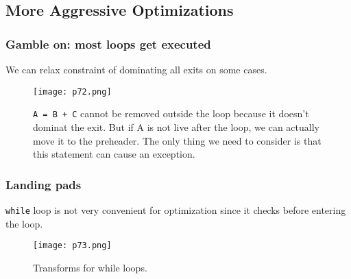 \subsection{More Aggressive Optimizations}

\subsubsection{Gamble on: most loops get executed}

We can relax constraint of dominating all exits on some cases.

\begin{figure}[H]
    \centering
     \texttt{[image: p72.png]}
         \caption{\texttt{A = B + C} cannot be removed outside the loop because it doesn't dominat the exit. But if A is not live after the loop, we can actually move it to the preheader. The only thing we need to consider is that this statement can cause an exception.}
         \label{fig:p72}
\end{figure}


\subsubsection{Landing pads}
\texttt{while} loop is not very convenient for optimization since it checks before entering the loop. 

\begin{figure}[H]
    \centering
     \texttt{[image: p73.png]}
         \caption{Transforms for while loops.}
         \label{fig:p73}
\end{figure}
